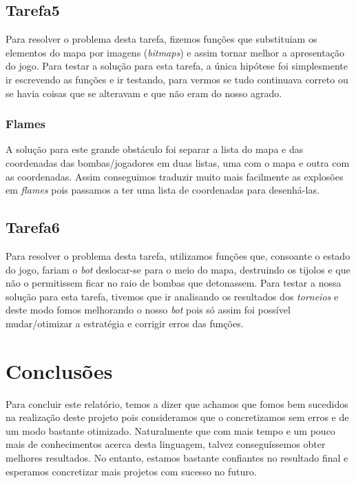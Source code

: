 \documentclass[a4paper]{report}
\begin{document}
\subsection{Tarefa5}

Para resolver o problema desta tarefa, fizemos funções que substituiam os elementos do mapa por imagens (\emph{bitmaps}) e assim tornar melhor a apresentação do jogo.
Para testar a solução para esta tarefa, a única hipótese foi simplesmente ir escrevendo as funções e ir testando, para vermos se tudo continuava correto ou se havia coisas que se alteravam e que não eram do nosso agrado.

\subsubsection{Flames}

A solução para este grande obstáculo foi separar a lista do mapa e das coordenadas das bombas/jogadores em duas listas, uma com o mapa e outra com as coordenadas. Assim conseguimos traduzir muito mais facilmente as explosões em \emph{flames} pois passamos a ter uma lista de coordenadas para desenhá-las. 

\subsection{Tarefa6}

Para resolver o problema desta tarefa, utilizamos funções que, consoante o estado do jogo, fariam o \emph{bot} deslocar-se para o meio do mapa, destruindo os tijolos e que não o permitissem ficar no raio de bombas que detonassem. 
Para testar a nossa solução para esta tarefa, tivemos que ir analisando os resultados dos \emph{torneios} e deste modo fomos melhorando o nosso \emph{bot} pois só assim foi possível mudar/otimizar a estratégia e corrigir erros das funções.

\section{Conclusões}
\label{sec:conclusao}

Para concluir este relatório, temos a dizer que achamos que fomos bem sucedidos na realização deste projeto pois consideramos que o concretizamos sem erros e de um modo bastante otimizado. Naturalmente que com mais tempo e um pouco mais de conhecimentos acerca desta linguagem, talvez conseguíssemos obter melhores resultados. No entanto, estamos bastante confiantes no resultado final e esperamos concretizar mais projetos com sucesso no futuro.
\end{document}
